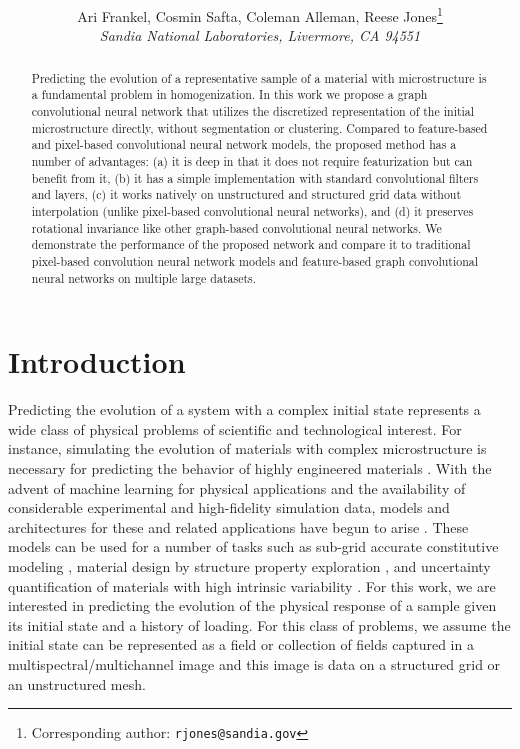\documentclass[12pt,reqno]{article}
\title{\bf
\ADD{Mesh-based graph convolutional neural networks for modeling materials with microstructure}
}
\author{Ari Frankel, Cosmin Safta, Coleman Alleman, Reese Jones\footnote{Corresponding author: \tt rjones@sandia.gov}\\
{\it Sandia National Laboratories, Livermore, CA 94551}
}
\newcommand{\ADD}[1]{{#1}}
\begin{document}
\date{}

\maketitle{}

\begin{abstract}
Predicting the evolution of a representative sample of a material with microstructure is a fundamental problem in homogenization.
In this work we propose a graph convolutional neural network that utilizes the discretized representation of the initial microstructure directly, without segmentation or clustering.
Compared to feature-based and pixel-based convolutional neural network models, the proposed method has a number of advantages:
(a) it is deep in that it does not require featurization but can benefit from it,
(b) it has a simple implementation with standard convolutional filters and layers,
(c) it works natively on unstructured and structured grid data without interpolation (unlike pixel-based convolutional neural networks),
and
(d) it preserves rotational invariance like other graph-based convolutional neural networks.
We demonstrate the performance of the proposed network and compare it to traditional pixel-based convolution neural network models and feature-based graph convolutional neural networks on \ADD{multiple} large datasets.
\end{abstract}

\section{Introduction}
Predicting the evolution of a system with a complex initial state represents a wide class of physical problems of scientific and technological interest.
For instance, simulating the evolution of materials with complex microstructure is necessary for predicting the behavior of highly engineered materials \cite{kraft1996extended,yin2008statistical,ghosh2011computational,stenzel2016predicting,li2017review,herriott2020predicting}.
With the advent of machine learning for physical applications and the availability of considerable experimental and high-fidelity simulation data, models and architectures for these and related applications have begun to arise \cite{frankel2019oligocrystals,frankel2019evolution,vlassis2020geometric,pandey2020machine}.
These models can be used for a number of tasks such as sub-grid accurate constitutive modeling \cite{frankel2019oligocrystals}, material design by structure property exploration \cite{noh2019inverse}, and uncertainty quantification of materials with high intrinsic variability \cite{khalil2021modeling}.
For this work, we are interested in predicting the evolution of the physical response of a sample given its initial state and a history of loading.
For this class of problems, we assume the initial state can be represented as a field or collection of fields captured in a multispectral/multichannel image and this image is data on a structured grid or an unstructured mesh.
\end{document}
